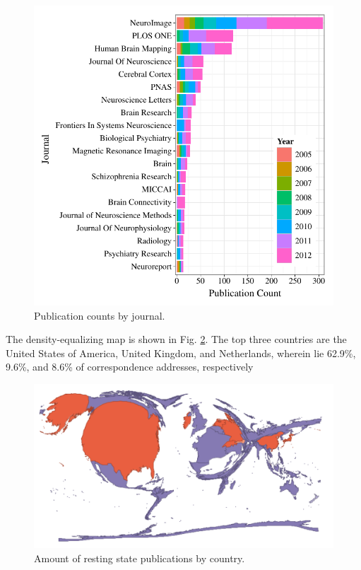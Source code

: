\documentclass[5p]{elsarticle}
\begin{document}
\begin{figure}
  \begin{center}
    \includegraphics[width=\linewidth]{figures/journal_dist}%
    \caption{Publication counts by journal.
        \label{fig:journal_dist}
    }
  \end{center}
\end{figure}


The density-equalizing map is shown in Fig. \ref{fig:resting_state_map}.
The top three countries are the United States of America, United Kingdom,
and Netherlands, wherein lie 62.9\%, 9.6\%, and 8.6\% of correspondence
addresses, respectively

\begin{figure}
  \begin{center}
    \includegraphics[width=\linewidth]{figures/resting_state_map}%
    \caption{Amount of resting state publications by country.
        \label{fig:resting_state_map}
    }
  \end{center}
\end{figure}
\end{document}
